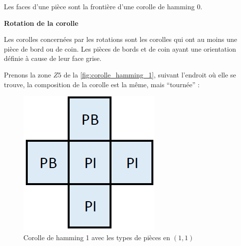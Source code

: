 	\begin{exmp}
		Les faces d'une pièce sont la frontière d'une corolle de hamming 0.
	\end{exmp}
	
	\textbf{Rotation de la corolle}
	
	Les corolles concernées par les rotations sont les corolles qui ont au moins une pièce de bord ou de coin. Les pièces de bords et de coin ayant une orientation définie à cause de leur face grise.
	
	\begin{exmp}
		Prenons la zone $Z5$ de la \autoref{fig:corolle_hamming_1}, suivant l'endroit où elle se trouve, la composition de la corolle est la même, mais \enquote{tournée} : \\
		\begin{minipage}{0.24\textwidth}
			\begin{figure}[H]
				\centering
				\includegraphics[width=\linewidth]{images/corolle_zone_orientee}
				\caption{Corolle de hamming 1 avec les types de pièces en $(1,1)$}
				\label{fig:corolle_zone_orientee}
			\end{figure}
		\end{minipage}\hfill
		\begin{minipage}{0.24\textwidth}
			\begin{figure}[H]

\end{figure}
\end{minipage}
\end{exmp}
